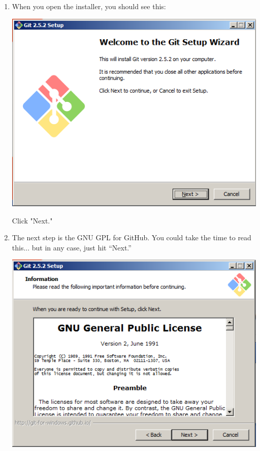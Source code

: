 \documentclass[11pt,fleqn]{article}
\theoremstyle{definition}
\begin{document}
\begin{enumerate}[Step 1.]
\item When you open the installer, you should see this:
\begin{center}
\includegraphics[scale=0.6]{gitwininstall1.png}
\end{center}
Click "Next."

\item The next step is the GNU GPL for GitHub. You could take the time to read
    this... but in any case, just hit ``Next.''
\begin{center}
\includegraphics[scale=0.6]{gitwininstall2.png}
\end{center}


\end{enumerate}
\end{document}

